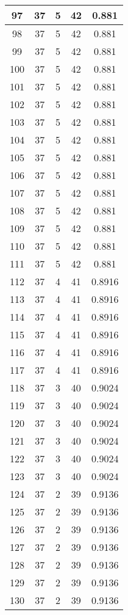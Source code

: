 \documentclass[letterpaper, 12pt]{article}
\begin{document}
\begin{longtable}{|c|c|c|c|c|}
\hline
97 & 37 & 5 & 42 & 0.881 \\
\hline
98 & 37 & 5 & 42 & 0.881 \\
\hline
99 & 37 & 5 & 42 & 0.881 \\
\hline
100 & 37 & 5 & 42 & 0.881 \\
\hline
101 & 37 & 5 & 42 & 0.881 \\
\hline
102 & 37 & 5 & 42 & 0.881 \\
\hline
103 & 37 & 5 & 42 & 0.881 \\
\hline
104 & 37 & 5 & 42 & 0.881 \\
\hline
105 & 37 & 5 & 42 & 0.881 \\
\hline
106 & 37 & 5 & 42 & 0.881 \\
\hline
107 & 37 & 5 & 42 & 0.881 \\
\hline
108 & 37 & 5 & 42 & 0.881 \\
\hline
109 & 37 & 5 & 42 & 0.881 \\
\hline
110 & 37 & 5 & 42 & 0.881 \\
\hline
111 & 37 & 5 & 42 & 0.881 \\
\hline
112 & 37 & 4 & 41 & 0.8916 \\
\hline
113 & 37 & 4 & 41 & 0.8916 \\
\hline
114 & 37 & 4 & 41 & 0.8916 \\
\hline
115 & 37 & 4 & 41 & 0.8916 \\
\hline
116 & 37 & 4 & 41 & 0.8916 \\
\hline
117 & 37 & 4 & 41 & 0.8916 \\
\hline
118 & 37 & 3 & 40 & 0.9024 \\
\hline
119 & 37 & 3 & 40 & 0.9024 \\
\hline
120 & 37 & 3 & 40 & 0.9024 \\
\hline
121 & 37 & 3 & 40 & 0.9024 \\
\hline
122 & 37 & 3 & 40 & 0.9024 \\
\hline
123 & 37 & 3 & 40 & 0.9024 \\
\hline
124 & 37 & 2 & 39 & 0.9136 \\
\hline
125 & 37 & 2 & 39 & 0.9136 \\
\hline
126 & 37 & 2 & 39 & 0.9136 \\
\hline
127 & 37 & 2 & 39 & 0.9136 \\
\hline
128 & 37 & 2 & 39 & 0.9136 \\
\hline
129 & 37 & 2 & 39 & 0.9136 \\
\hline
130 & 37 & 2 & 39 & 0.9136 \\

\end{longtable}
\end{document}
